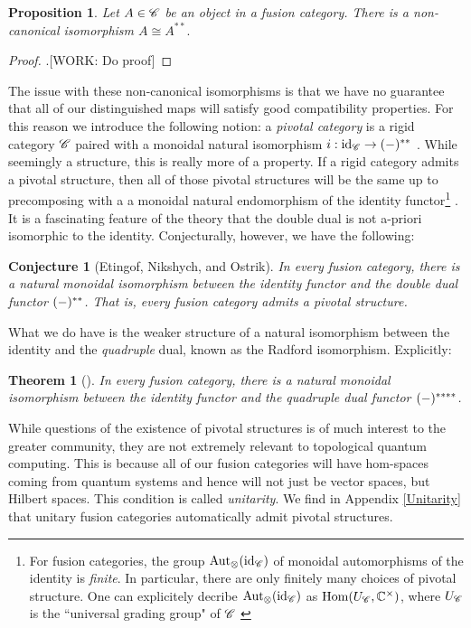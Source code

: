 \documentclass{article}
\newtheorem{theorem}{Theorem}[section]
\newtheorem{conjecture}{Conjecture}[section]
\newtheorem{proposition}{Proposition}[section]
\theoremstyle{definition}
\numberwithin{figure}{section}
\begin{document}
\begin{proposition}\label{two-duals} Let $A\in \mathscr{C}$ be an object in a fusion category. There is a non-canonical isomorphism $A\cong A^{**}.$
\end{proposition}
\begin{proof}.[WORK: Do proof]
\end{proof}

The issue with these non-canonical isomorphisms is that we have no guarantee that all of our distinguished maps will satisfy good compatibility properties. For this reason we introduce the following notion: a \textit{pivotal category} is a rigid category $\mathscr{C}$ paired with a monoidal natural isomorphism $i:\mathrm{id}_{\mathscr{C}}\to (\--)^{**}$ \cite{selinger2011survey}. While seemingly a structure, this is really more of a property. If a rigid category admits a pivotal structure, then all of those pivotal structures will be the same up to precomposing with a a monoidal natural endomorphism of the identity functor\footnote{For fusion categories, the group $\mathrm{Aut}_{\otimes}(\mathrm{id}_{\mathscr{C}})$ of monoidal automorphisms of the identity is \textit{finite}. In particular, there are only finitely many choices of pivotal structure. One can explicitely decribe $\mathrm{Aut}_{\otimes}(\mathrm{id}_{\mathscr{C}})$ as $\mathrm{Hom}(U_{\mathscr{C}},\mathbb{C}^{\times})$, where $U_{\mathscr{C}}$ is the ``universal grading group" of $\mathscr{C}$ \cite[Prop. 3.9]{gelaki2008nilpotent}} \cite[Prop. 5.7, Lemma 6.2]{bartlett2009unitary}. It is a fascinating feature of the theory that the double dual is not a-priori isomorphic to the identity. Conjecturally, however, we have the following:

\begin{conjecture}[Etingof, Nikshych, and Ostrik] In every fusion category, there is a natural monoidal isomorphism between the identity functor and the double dual functor $(\--)^{**}$. That is, every fusion category admits a pivotal structure.
\end{conjecture}

What we do have is the weaker structure of a natural isomorphism between the identity and the \textit{quadruple} dual, known as the Radford isomorphism. Explicitly:

\begin{theorem}[\cite{etingof2005fusion}] In every fusion category, there is a natural monoidal isomorphism between the identity functor and the quadruple dual functor $(\--)^{****}$.
\end{theorem}


While questions of the existence of pivotal structures is of much interest to the greater community, they are not extremely relevant to topological quantum computing. This is because all of our fusion categories will have hom-spaces coming from quantum systems and hence will not just be vector spaces, but Hilbert spaces. This condition is called \textit{unitarity}. We find in Appendix \ref{Unitarity} that unitary fusion categories automatically admit pivotal structures.
\end{document}

